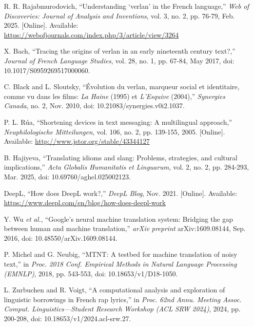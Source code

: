 \documentclass[12pt]{article}
\begin{document}
\cleardoublepage
{}
\begin{thebibliography}{99}

R. R. Rajabmurodovich, ``Understanding `verlan' in the French language,'' \textit{Web of Discoveries: Journal of Analysis and Inventions}, vol. 3, no. 2, pp. 76-79, Feb. 2025. [Online]. Available: \url{https://webofjournals.com/index.php/3/article/view/3264}

X. Bach, ``Tracing the origins of verlan in an early nineteenth century text?,'' \textit{Journal of French Language Studies}, vol. 28, no. 1, pp. 67-84, May 2017, doi: 10.1017/S0959269517000060.

C. Black and L. Sloutsky, ``Évolution du verlan, marqueur social et identitaire, comme vu dans les films: \textit{La Haine} (1995) et \textit{L'Esquive} (2004),'' \textit{Synergies Canada}, no. 2, Nov. 2010, doi: 10.21083/synergies.v0i2.1037.

P. L. Rúa, ``Shortening devices in text messaging: A multilingual approach,'' \textit{Neuphilologische Mitteilungen}, vol. 106, no. 2, pp. 139-155, 2005. [Online]. Available: \url{http://www.jstor.org/stable/43344127}

B. Hajiyeva, ``Translating idioms and slang: Problems, strategies, and cultural implications,'' \textit{Acta Globalis Humanitatis et Linguarum}, vol. 2, no. 2, pp. 284-293, Mar. 2025, doi: 10.69760/aghel.025002123.

DeepL, ``How does DeepL work?,'' \textit{DeepL Blog}, Nov. 2021. [Online]. Available: \url{https://www.deepl.com/en/blog/how-does-deepl-work}

Y. Wu \textit{et al.}, ``Google's neural machine translation system: Bridging the gap between human and machine translation,'' \textit{arXiv preprint} arXiv:1609.08144, Sep. 2016, doi: 10.48550/arXiv.1609.08144.

P. Michel and G. Neubig, ``MTNT: A testbed for machine translation of noisy text,'' in \textit{Proc. 2018 Conf. Empirical Methods in Natural Language Processing (EMNLP)}, 2018, pp. 543-553, doi: 10.18653/v1/D18-1050.

L. Zurbuchen and R. Voigt, ``A computational analysis and exploration of linguistic borrowings in French rap lyrics,'' in \textit{Proc. 62nd Annu. Meeting Assoc. Comput. Linguistics—Student Research Workshop (ACL SRW 2024)}, 2024, pp. 200-208, doi: 10.18653/v1/2024.acl-srw.27.


\end{thebibliography}
\end{document}
